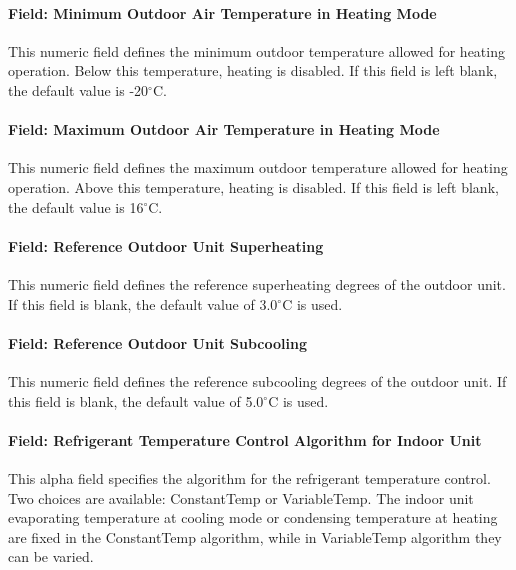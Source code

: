 \paragraph{Field: Minimum Outdoor Air Temperature in Heating Mode}\label{field-minimum-outdoor-air-temperature-in-heating-mode}

This numeric field defines the minimum outdoor temperature allowed for heating operation. Below this temperature, heating is disabled. If this field is left blank, the default value is -20$^\circ$C.

\paragraph{Field: Maximum Outdoor Air Temperature in Heating Mode}\label{field-maximum-outdoor-air-temperature-in-heating-mode}

This numeric field defines the maximum outdoor temperature allowed for heating operation. Above this temperature, heating is disabled. If this field is left blank, the default value is 16$^\circ$C.

\paragraph{Field: Reference Outdoor Unit Superheating}\label{field-outdoor-unit-reference-superheating}

This numeric field defines the reference superheating degrees of the outdoor unit. If this field is blank, the default value of 3.0$^\circ$C is used.

\paragraph{Field: Reference Outdoor Unit Subcooling}\label{field-outdoor-unit-reference-subcooling}

This numeric field defines the reference subcooling degrees of the outdoor unit. If this field is blank, the default value of 5.0$^\circ$C is used.

\paragraph{Field: Refrigerant Temperature Control Algorithm for Indoor Unit}\label{field-refrigerant-temperature-control-algorithm-for-indoor-unit}

This alpha field specifies the algorithm for the refrigerant temperature control. Two choices are available: ConstantTemp or VariableTemp. The indoor unit evaporating temperature at cooling mode or condensing temperature at heating are fixed in the ConstantTemp algorithm, while in VariableTemp algorithm they can be varied.

